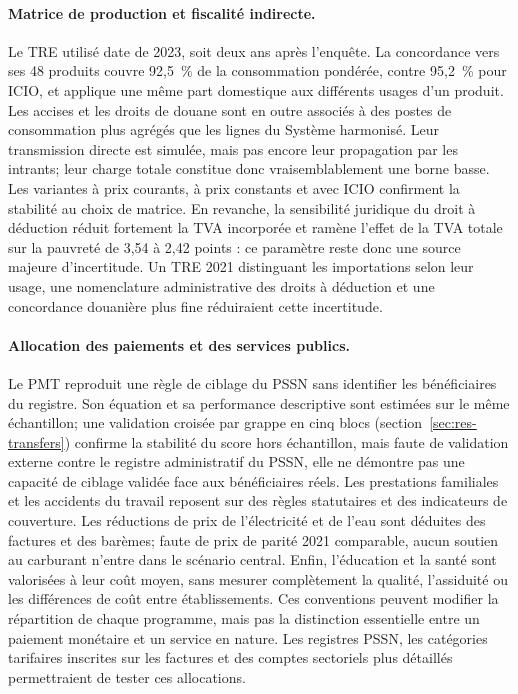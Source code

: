 \documentclass[11pt,a4paper]{article}
\begin{document}
\paragraph{Matrice de production et fiscalité indirecte.}
Le TRE utilisé date de 2023, soit deux ans après l'enquête. La concordance vers
ses 48 produits couvre 92,5~\% de la consommation pondérée, contre 95,2~\%
pour ICIO, et applique une même part domestique aux différents usages d'un
produit. Les accises et les droits de douane sont en outre associés à des
postes de consommation plus agrégés que les lignes du Système harmonisé. Leur
transmission directe est simulée, mais pas encore leur propagation par les
intrants; leur charge totale constitue donc vraisemblablement une borne basse.
Les variantes à prix courants, à prix constants et avec ICIO confirment la
stabilité au choix de matrice. En revanche, la sensibilité juridique du droit à
déduction réduit fortement la TVA incorporée et ramène l'effet de la TVA totale
sur la pauvreté de 3,54 à 2,42 points : ce paramètre reste donc une source
majeure d'incertitude. Un TRE 2021 distinguant les importations selon
leur usage, une nomenclature administrative des droits à déduction et une
concordance douanière plus fine réduiraient cette incertitude.

\paragraph{Allocation des paiements et des services publics.}
Le PMT reproduit une règle de ciblage du PSSN sans identifier les bénéficiaires
du registre. Son équation et sa performance descriptive sont estimées sur le
même échantillon; une validation croisée par grappe en cinq blocs
(section~\ref{sec:res-transfers}) confirme la stabilité du score hors
échantillon, mais faute de validation externe contre le registre administratif
du PSSN, elle ne démontre pas une capacité de ciblage validée face aux
bénéficiaires réels. Les prestations familiales et les accidents du travail reposent
sur des règles statutaires et des indicateurs de couverture. Les réductions de
prix de l'électricité et de l'eau sont déduites des factures et des barèmes;
faute de prix de parité 2021 comparable, aucun soutien au carburant n'entre dans
le scénario central. Enfin, l'éducation et la santé sont valorisées à leur coût
moyen, sans mesurer complètement la qualité, l'assiduité ou les différences de
coût entre établissements. Ces conventions peuvent modifier la répartition de
chaque programme, mais pas la distinction essentielle entre un paiement
monétaire et un service en nature. Les registres PSSN, les catégories
tarifaires inscrites sur les factures et des comptes sectoriels plus détaillés
permettraient de tester ces allocations.
\end{document}

